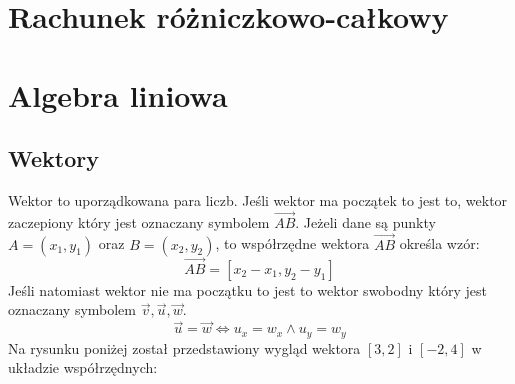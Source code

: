 \documentclass[12pt, a4paper]{article}
\begin{document}
\section{Rachunek różniczkowo-całkowy}
\section{Algebra liniowa}
\subsection{Wektory}
Wektor to uporządkowana para liczb. Jeśli wektor ma początek to jest to, wektor
zaczepiony który jest oznaczany symbolem $\overrightarrow{AB}$. Jeżeli dane są punkty
$A = (x_1,y_1)$ oraz $B = (x_2,y_2)$,
to współrzędne wektora $\overrightarrow{AB}$ określa wzór: $$\overrightarrow{AB} = [x_2-x_1,y_2-y_1]$$
Jeśli natomiast wektor nie ma początku to jest to wektor swobodny który
jest oznaczany symbolem $\overrightarrow{v}, \overrightarrow{u}, \overrightarrow{w}$.
$$\overrightarrow{u} = \overrightarrow{w} \Longleftrightarrow u_x = w_x \wedge u_y = w_y$$
Na rysunku poniżej został przedstawiony wygląd wektora $[3,2]$ i $[-2,4]$ w układzie współrzędnych:
\end{document}
